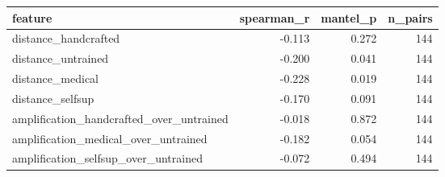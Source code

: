 \begin{tabular}{lrrr}
\toprule
feature & spearman\_r & mantel\_p & n\_pairs \\
\midrule
distance\_handcrafted & -0.113 & 0.272 & 144 \\
distance\_untrained & -0.200 & 0.041 & 144 \\
distance\_medical & -0.228 & 0.019 & 144 \\
distance\_selfsup & -0.170 & 0.091 & 144 \\
amplification\_handcrafted\_over\_untrained & -0.018 & 0.872 & 144 \\
amplification\_medical\_over\_untrained & -0.182 & 0.054 & 144 \\
amplification\_selfsup\_over\_untrained & -0.072 & 0.494 & 144 \\
\bottomrule
\end{tabular}
